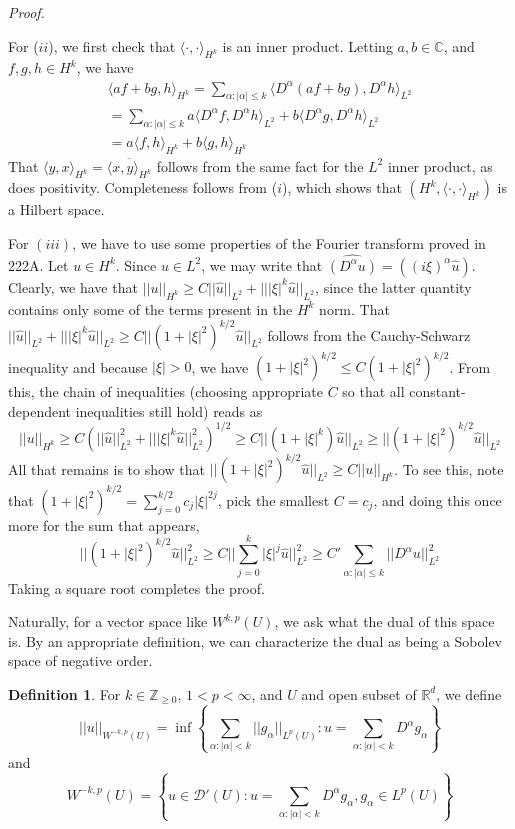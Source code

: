 \documentclass[letterpaper,10pt]{article}
\newcommand{\wkp}{W^{k,p}}
\theoremstyle{definition}
\newtheorem{dfn}{Definition}
\theoremstyle{remark}
\theoremstyle{plain}
\newenvironment{proofm}{
    \vspace{5pt}
    \begin{mdframed}[
        bottomline=false,topline=false,rightline=false, linecolor=red,linewidth=2pt, skipabove=0
    ]
    \noindent\textit{Proof.}
}{
    \hspace{\fill}\qedsymbol\end{mdframed}
}
\begin{document}
\begin{proofm}
    For ($ii$), we first check that $\langle\cdot,\cdot\rangle_{H^k}$ is an inner product.
    Letting $a,b\in\mathbb C$, and $f,g,h\in H^k$, we have
    \begin{align*}
        \langle af+bg,h\rangle_{H^k}
        =\sum_{\alpha:|\alpha|\leq k}^{}\langle D^\alpha(af+bg),D^\alpha h\rangle_{L^2}\\
        =\sum_{\alpha:|\alpha|\leq k}^{}a\langle D^\alpha f,D^\alpha h\rangle_{L^2}+b\langle D^\alpha g,D^\alpha h\rangle_{L^2}\\
        =a\langle f,h\rangle_{H^k}+b\langle g,h\rangle_{H^k}
    \end{align*}
    That $\langle y,x\rangle_{H^k}=\overline{\langle x,y\rangle_{H^k}}$ follows 
    from the same fact for the $L^2$ inner product, as does positivity.
    Completeness follows from ($i$), which shows that $(H^k,\langle\cdot,\cdot\rangle_{H^k})$ 
    is a Hilbert space.

    For $(iii)$, we have to use some properties of the Fourier transform proved in
    222A. Let $u\in H^k$. %
    Since $u\in L^2$, we may write that $\widehat{(D^\alpha u)}=
    ((i\xi)^\alpha\hat u)$. 
    Clearly, we have that $||u||_{H^k}\geq C||\hat u||_{L^2}+|||\xi|^k\hat u||_{L^2}$,
    since the latter quantity contains only some of the terms present in the $H^k$ norm.
    That $||\hat u||_{L^2}+|||\xi|^k\hat u||_{L^2}\geq C||(1+|\xi|^2)^{k/2}\hat u||_{L^2}$
    follows from the Cauchy-Schwarz inequality and because $|\xi|>0$, we have 
    $(1+|\xi|^2)^{k/2}\leq C(1+|\xi|^2)^{k/2}$.
    From this, the chain of inequalities (choosing appropriate $C$ so that all constant-dependent
    inequalities still hold) reads as
    $$
    ||u||_{H^k}\geq C\left(||\hat u||_{L^2}^2+|||\xi|^k\hat u||_{L^2}^2\right)^{1/2}
    \geq C||(1+|\xi|^k)\hat u||_{L^2}\geq ||(1+|\xi|^2)^{k/2}\hat u||_{L^2}
    $$
    All that remains is to show that $||(1+|\xi|^2)^{k/2}\hat u||_{L^2}\geq C||u||_{H^k}$.
    To see this, note that $(1+|\xi|^2)^{k/2}=\sum_{j=0}^{k/2}c_j|\xi|^{2j}$, pick the 
    smallest $C=c_j$, and doing this once more for the sum that appears,
    $$
    ||(1+|\xi|^2)^{k/2}\hat u||_{L^2}^2\geq C||\sum_{j=0}^{k}|\xi|^j\hat u||_{L^2}^2
    \geq C'\sum_{\alpha:|\alpha|\leq k}^{}||D^\alpha u||_{L^2}^2
    $$
    Taking a square root completes the proof.
\end{proofm}
Naturally, for a vector space like $\wkp(U)$, we ask what the dual of this 
space is. By an appropriate definition, we can characterize the dual 
as being a Sobolev space of negative order.
\begin{dfn}
    For $k\in\mathbb Z_{\geq 0}$, $1<p<\infty$, and $U$ and open subset 
    of $\mathbb R^d$, we define
    $$
    ||u||_{W^{-k,p}(U)}=\inf\left\{\sum_{\alpha:|\alpha|<k}^{}||g_\alpha||_{L^p(U)}:u=\sum_{\alpha:|\alpha|<k}^{}D^\alpha g_\alpha\right\}
    $$
    and 
    $$
    W^{-k,p}(U)=\left\{u\in\mathcal D'(U):u=\sum_{\alpha:|\alpha|<k}^{}D^\alpha g_\alpha, g_\alpha\in L^p(U)\right\}
    $$
\end{dfn}
\end{document}
